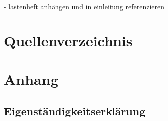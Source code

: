 \appendix

- lastenheft anhängen und in einleitung referenzieren

\newpage


\section{Quellenverzeichnis}

\printbibliography

\newpage

\renewcommand{\listfigurename}{Abbildungsverzeichnis}
\listoffigures

\renewcommand{\listfigurename}{Tabellenverzeichnis}
\listoftables

\newpage


\section{Anhang}

\subsection{Eigenständigkeitserklärung}
